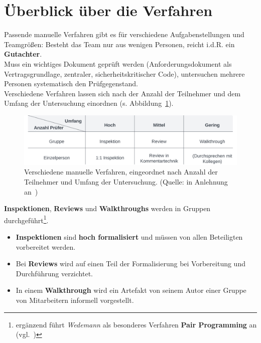 \section{Überblick über die Verfahren}

Passende manuelle Verfahren gibt es für verschiedene Aufgabenstellungen und Teamgrößen: Besteht das Team nur aus wenigen Personen, reicht i.d.R. ein \textbf{Gutachter}.\\
Muss ein wichtiges Dokument geprüft werden (Anforderungsdokument als Vertragsgrundlage, zentraler, sicherheitskritischer Code), untersuchen mehrere Personen systematisch den Prüfgegenstand.\\

\noindent
Verschiedene Verfahren lassen sich nach der Anzahl der Teilnehmer und dem Umfang der Untersuchung einordnen (s. Abbildung~\ref{fig:manuelleverfahren}).

\begin{figure}
    \centering
    \includegraphics[scale=0.4]{part four/Manuelle Verfahren/img/manuelleverfahren}
    \caption{Verschiedene manuelle Verfahren, eingeordnet nach Anzahl der Teilnehmer und Umfang der Untersuchung. (Quelle: in Anlehnung an~\cite[Tab. 3.1, 17]{Wed09c})}
    \label{fig:manuelleverfahren}
\end{figure}

\noindent
\textbf{Inspektionen}, \textbf{Reviews} und \textbf{Walkthroughs} werden in Gruppen durchgeführt\footnote{
ergänzend führt \textit{Wedemann} als besonderes Verfahren \textbf{Pair Programming} an (vgl.~\cite[18]{Wed09c})
}.\\

\begin{itemize}
    \item \textbf{Inspektionen} sind \textbf{hoch formalisiert} und müssen von allen Beteiligten vorbereitet werden.
    \item Bei \textbf{Reviews} wird auf einen Teil der Formalisierung bei Vorbereitung und Durchführung verzichtet.
    \item In einem \textbf{Walkthrough} wird ein Artefakt von seinem Autor einer Gruppe von Mitarbeitern informell vorgestellt.
\end{itemize}
